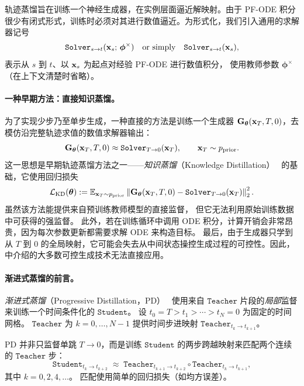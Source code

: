 轨迹蒸馏旨在训练一个神经生成器，在实例层面逼近解映射。由于 PF-ODE 积分很少有闭式形式，训练时必须对其进行数值逼近。为形式化，我们引入通用的求解器记号
\begin{align}\label{eq:solver}
    \mathtt{Solver}_{s\to t}({\mathbf{x}}_s;\,\bm{\phi}^\times)
    \quad \text{or simply} \quad
    \mathtt{Solver}_{s\to t}({\mathbf{x}}_s),
\end{align}
表示从 $s$ 到 $t$、以 ${\mathbf{x}}_s$ 为起点对经验 PF-ODE 进行数值积分，
使用教师参数 $\bm{\phi}^\times$（在上下文清楚时省略）。



\paragraph{一种早期方法：直接知识蒸馏。}
为了实现少步乃至单步生成，一种直接的方法是训练一个生成器 ${\mathbf{G}}_{\bm{\theta}}({\mathbf{x}}_T, T,0)$，去模仿沿完整轨迹求值的数值求解器输出：
\[
{\mathbf{G}}_{\bm{\theta}}({\mathbf{x}}_T, T,0)\approx \mathtt{Solver}_{T\to 0}({\mathbf{x}}_T), 
\qquad {\mathbf{x}}_T \sim p_{\mathrm{prior}}.
\]
这一思想是早期轨迹蒸馏方法之一——\emph{知识蒸馏}（Knowledge Distillation）~\citep{luhman2021knowledge} 的基础，它使用回归损失
\[
\mathcal{L}_{\mathrm{KD}}({\bm{\theta}})
:= 
\mathbb{E}_{{\mathbf{x}}_T \sim p_{\mathrm{prior}}}
\left\|
{\mathbf{G}}_{\bm{\theta}}({\mathbf{x}}_T, T,0)
-
\mathtt{Solver}_{T\to 0}({\mathbf{x}}_T)
\right\|_2^2.
\]
虽然该方法能提供来自预训练教师模型的直接监督，
但它无法利用原始训练数据中可获得的强监督。
此外，若在训练循环中调用 ODE 积分，计算开销会非常昂贵，因为每次参数更新都需要求解 ODE 来构造目标。
最后，由于生成器只学到从 $T$ 到 $0$ 的全局映射，它可能会失去从中间状态操控生成过程的可控性。因此， 中介绍的大多数可控生成技术无法直接应用。




\paragraph{渐进式蒸馏的前言。}
\emph{渐进式蒸馏}（Progressive Distillation，PD）~\citep{salimans2021progressive} 使用来自 $\mathtt{Teacher}$ 片段的\emph{局部}监督来训练一个时间条件化的 $ \mathtt{Student} $。
设 $t_0=T>t_1>\cdots>t_N=0$ 为固定的时间网格。
$ \mathtt{Teacher} $ 为 $k=0,\ldots,N-1$ 提供时间步进映射 $\mathtt{Teacher}_{t_k\to t_{k+1}}$。


PD 并非只监督单跳 $T\to 0$，而是训练 $ \mathtt{Student}  $ 的两步跨越映射来匹配两个连续的 $ \mathtt{Teacher}$ 步：
\[
\mathtt{Student}_{t_k\to t_{k+2}}
\;\approx\;
\mathtt{Teacher}_{t_{k+1}\to t_{k+2}}
\circ
\mathtt{Teacher}_{t_{k}\to t_{k+1}},
\]
其中 $k = 0, 2, 4, \dots$。
匹配使用简单的回归损失（如均方误差）。


